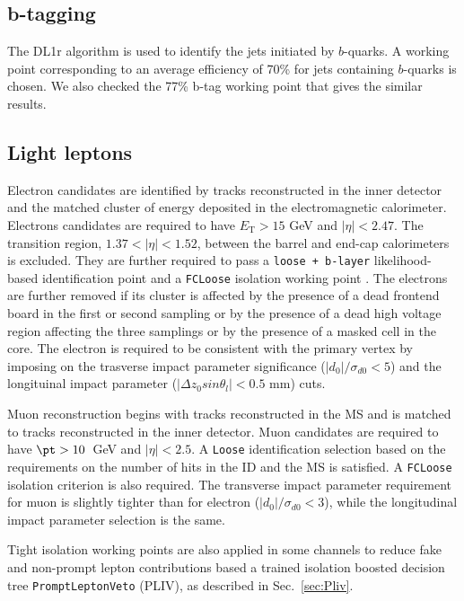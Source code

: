 \subsection{b-tagging}
The {\texttt\scriptsize DL1r} \cite{btag1} algorithm is used to identify the jets initiated by $b$-quarks. A working point corresponding to an average efficiency of 70\% for jets containing $b$-quarks is chosen. We also checked the 77\% b-tag working point that gives the similar results. 

\subsection{Light leptons}
Electron candidates are identified by tracks reconstructed in the inner detector and the matched cluster of energy deposited in the electromagnetic calorimeter. Electrons candidates are required to have $E_{\text{T}} > 15$ GeV and $|\eta|<2.47$. The transition region, $1.37<|\eta|<1.52$, between the barrel and end-cap calorimeters is excluded. They are further required to pass a \texttt{loose + b-layer} likelihood-based identification point \cite{ElectronID} and a \texttt{FCLoose} isolation working point \cite{IsolationWP}. The electrons are further removed  if its cluster is affected by the presence of a dead frontend board in the first or second sampling or by the presence of a dead high voltage region affecting the three samplings or by the presence of a masked cell in the core. The electron is required to be consistent with the primary vertex by imposing on the trasverse impact parameter significance ($|d_0|/\sigma_{d0}<5$) and 
the longituinal impact parameter ($|\Delta z_0 sin\theta_l|<0.5$ mm) cuts. 

Muon reconstruction begins with tracks reconstructed in the MS and is matched to tracks reconstructed in the inner detector. Muon candidates are required to have $\pt>10$~GeV and $|\eta|<2.5$. A \texttt{Loose} identification selection \cite{MuonSelectionTool} based on the requirements on the number of hits in the ID and the MS is satisfied. A \texttt{FCLoose} isolation \cite{IsolationWP} criterion is also required. The transverse impact parameter requirement for muon is slightly tighter than for electron ($|d_0|/\sigma_{d0}<3$), while the longitudinal impact
parameter selection is the same. 

Tight isolation working points are also applied in some channels to reduce fake and non-prompt lepton contributions based a trained isolation boosted decision tree \texttt{PromptLeptonVeto} 
(PLIV), as described in Sec.~\ref{sec:Pliv}.

